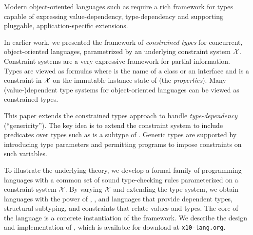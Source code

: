 Modern object-oriented languages such as \Xten require a rich framework
for types capable of expressing value-dependency, type-dependency
and supporting pluggable, application-specific extensions.

In earlier work, we presented the framework of \emph{constrained
types} for concurrent, object-oriented languages, parametrized by
an underlying constraint system $\cal X$. Constraint systems are a
very expressive framework for partial information. Types are viewed
as formulas  where  is the name of a class
or an interface and  is a constraint in $\cal X$ on the
immutable instance state of  (the \emph{properties}).
Many (value-)dependent type systems for object-oriented languages
can be viewed as constrained types.

This paper extends the constrained types approach to handle
\emph{type-dependency} (``genericity''). The key idea is to extend
the constraint system to include predicates over types such as
 is a subtype of .  Generic types are supported
by introducing type parameters and permitting programs to impose
constraints on such variables.

To illustrate the underlying theory, we develop a formal family of
programming languages with a common set of sound type-checking rules
parameterized on a constraint system $\cal X$.  By varying $\cal X$
and extending the type system, we obtain languages with the power
of \FJ, \FGJ, and languages that provide dependent types, structural
subtyping, and constraints that relate values and types.  The core
of the \Xten language is a concrete instantiation of the framework.  We
describe the design and implementation of \Xten, which is available
for download at \texttt{x10-lang.org}.

